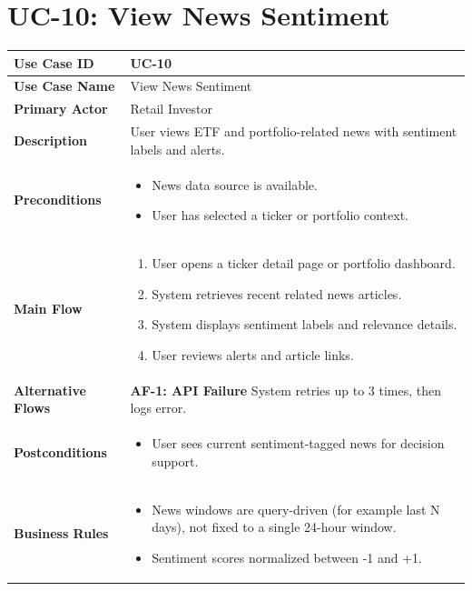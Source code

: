 \section{UC-10: View News Sentiment}
\label{uc:news-sentiment}

\begin{longtable}{|>{\raggedright\arraybackslash\bfseries}p{3.5cm}|p{11cm}|}
\hline
\rowcolor{gray!15} Use Case ID & UC-10 \\ \hline
Use Case Name & View News Sentiment \\ \hline
Primary Actor & Retail Investor \\ \hline
Description & User views ETF and portfolio-related news with sentiment labels and alerts. \\ \hline
Preconditions &
\begin{itemize}[leftmargin=*, nosep]
    \item News data source is available.
    \item User has selected a ticker or portfolio context.
\end{itemize} \\ \hline
Main Flow &
\begin{enumerate}[leftmargin=*, nosep]
    \item User opens a ticker detail page or portfolio dashboard.
    \item System retrieves recent related news articles.
    \item System displays sentiment labels and relevance details.
    \item User reviews alerts and article links.
\end{enumerate} \\ \hline
Alternative Flows &
\textbf{AF-1: API Failure} \newline
System retries up to 3 times, then logs error. \\ \hline
Postconditions &
\begin{itemize}[leftmargin=*, nosep]
    \item User sees current sentiment-tagged news for decision support.
\end{itemize} \\ \hline
Business Rules &
\begin{itemize}[leftmargin=*, nosep]
    \item News windows are query-driven (for example last N days), not fixed to a single 24-hour window.
    \item Sentiment scores normalized between -1 and +1.
\end{itemize} \\ \hline
\end{longtable}
